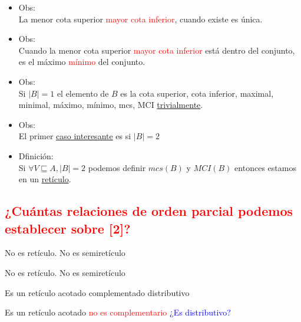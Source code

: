 \documentclass[12pt, twoside]{article}
\begin{document}
\begin{figure}[H]
	\centering
	
\end{figure}
\begin{itemize}
	\item Obs:\\
		La menor cota superior \textcolor{red}{mayor cota inferior}, cuando existe es única.
	\item Obs:\\
		Cuando la menor cota superior \textcolor{red}{mayor cota inferior} está
		dentro del conjunto, es el máximo \textcolor{red}{mínimo} del conjunto.
	\item Obs:\\
		Si $|B|=1$ el elemento de $B$ es la cota superior, cota inferior, maximal, minimal,
		máximo, mínimo, mcs, MCI \underline{trivialmente}.
	\item Obs:\\
		El primer \underline{caso interesante} es si $|B|=2$
	\item Dfinición:\\
		Si $\forall V \sqsubseteq A, |B|=2$ podemos definir $mcs(B)$ y $MCI(B)$
		entonces estamos en un \underline{retículo}.
\end{itemize}
\textcolor{red}{\section{¿Cuántas relaciones de orden parcial podemos establecer sobre [2]?}}
\begin{figure}[H]
	\centering
	
\end{figure}

No es retículo. No es semiretículo
\begin{figure}[H]
	\centering
	
\end{figure}

No es retículo. No es semiretículo
\begin{figure}[H]
	\centering
	
\end{figure}

Es un retículo acotado complementado distributivo
\begin{figure}[H]
	\centering
	
\end{figure}

Es un retículo acotado \textcolor{red}{no es complementario}
\textcolor{blue}{¿Es distributivo?}
\begin{figure}[H]
	\centering
	
\end{figure}
\end{document}
